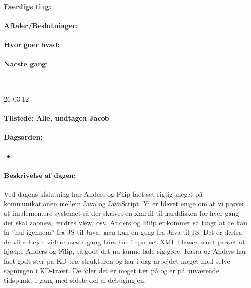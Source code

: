 \documentclass[a4paper,10pt,titlepage]{article}
\begin{document}
		\paragraph{Faerdige ting:}
		
		\paragraph{Aftaler/Beslutninger:}
		
		\paragraph{Hvor goer hvad:}
		
		\paragraph{Naeste gang:}\mbox{}\\
		
		\begin{center}
		26-03-12
		\end{center}
		
		\paragraph{Tilstede: Alle, undtagen Jacob}
		\paragraph{Dagsorden:}
		\begin{itemize}
					\item 
					
		\end{itemize}
		
		\paragraph{Beskrivelse af dagen:}
		Ved dagens afslutning har Anders og Filip fået set rigtig meget på kommunikationen mellem Java og JavaScript. Vi er blevet enige om at vi prøver at implementere systemet så der skrives en xml-fil til harddisken for hver gang der skal zoomes, ændres view, osv. Anders og Filip er kommet så langt at de kan få ”hul igennem” fra JS til Java, men kun én gang fra Java til JS. Det er derfra de vil arbejde videre næste gang.Lars har finpudset XML-klassen samt prøvet at hjælpe Anders og Filip, så godt det nu kunne lade sig gøre.
Kasra og Anders har fået godt styr på KD-træ-strukturen og har i dag arbejdet meget med selve søgningen i KD-træet. De føler det er meget tæt på og er på nuværende tidspunkt i gang med sidste del af debuging’en.
\end{document}
